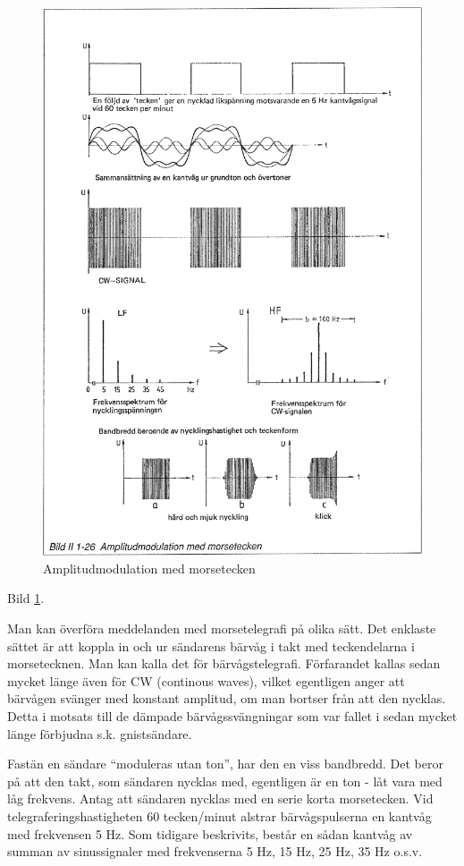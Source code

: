 \begin{figure}
\includegraphics[width=\textwidth]{images/bild_2_1-26}
\caption{Amplitudmodulation med morsetecken}
\label{fig:BildII1-26}
\end{figure}

Bild \ref{fig:BildII1-26}.

Man kan överföra meddelanden med morsetelegrafi på olika sätt. Det enklaste
sättet är att koppla in och ur sändarens bärvåg i takt med teckendelarna i
morsetecknen. Man kan kalla det för bärvågstelegrafi. Förfarandet kallas sedan
mycket länge även för CW (continous waves), vilket egentligen anger att
bärvågen svänger med konstant amplitud, om man bortser från att den nycklas.
Detta i motsats till de dämpade bärvågssvängningar som var fallet i sedan
mycket länge förbjudna s.k. gnistsändare.

Fastän en sändare ``moduleras utan ton'', har den en viss bandbredd. Det beror på
att den takt, som sändaren nycklas med, egentligen är en ton - låt vara med låg
frekvens. Antag att sändaren nycklas med en serie korta morsetecken. Vid
telegraferingshastigheten 60 tecken/minut alstrar bärvågspulserna en kantvåg
med frekvensen 5 Hz. Som tidigare beskrivits, består en sådan kantvåg av summan
av sinussignaler med frekvenserna 5 Hz, 15 Hz, 25 Hz, 35 Hz o.s.v.

